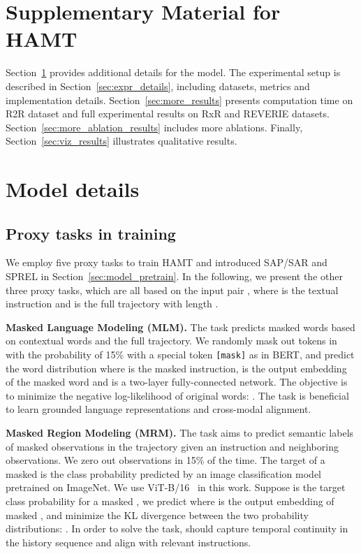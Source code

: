 \appendix

\section*{Supplementary Material for HAMT}

Section~\ref{sec:model_details} provides additional details for the model. The experimental setup is described in Section~\ref{sec:expr_details}, including datasets, metrics and implementation details.
Section~\ref{sec:more_results} presents computation time on R2R dataset and full experimental results on RxR and REVERIE datasets. Section~\ref{sec:more_ablation_results} includes more ablations. 
Finally, Section~\ref{sec:viz_results} illustrates qualitative results.

\section{Model details}
\label{sec:model_details}
\subsection{Proxy tasks in training}
We employ five proxy tasks to train HAMT and introduced SAP/SAR and SPREL in Section~\ref{sec:model_pretrain}. In the following, we present the other three proxy tasks, which are all based on the input pair , where  is the textual instruction and  is the full trajectory with length .

\noindent\textbf{Masked Language Modeling (MLM).}
The task predicts masked words based on contextual words and the full trajectory.
We randomly mask out tokens in  with the probability of 15\% with a special token \verb|[mask]| as in BERT, and predict the word distribution  where  is the masked instruction,  is the output embedding of the masked word  and  is a two-layer fully-connected network.
The objective is to minimize the negative log-likelihood of original words: .
The task is beneficial to learn grounded language representations and cross-modal alignment.

\noindent\textbf{Masked Region Modeling (MRM).}
The task aims to predict semantic labels of masked observations in the trajectory given an instruction and neighboring observations.
We zero out observations in  15\% of the time. The target of a masked  is the class probability predicted by an image classification model pretrained on ImageNet. We use ViT-B/16~\cite{dosovitskiy2020image} in this work. 
Suppose  is the target class probability for a masked , we predict  where  is the output embedding of masked , and minimize the KL divergence between the two probability distributions: .
In order to solve the task,  should capture temporal continuity in the history sequence and align with relevant instructions. 

